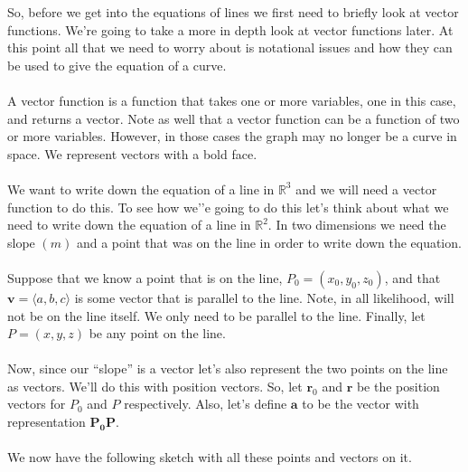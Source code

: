 \documentclass[10pt,reqno]{book}
\theoremstyle{definition}
\renewcommand{\vec}[1]{\mathbf{#1}}
\def\R{\mathbb{R}}
\begin{document}
	So, before we get into the equations of lines we first need to briefly look at vector functions.  We’re going to take a more in depth look at vector functions later.  At this point all that we need to worry about is notational issues and how they can be used to give the equation of a curve.\\ \\
	A vector function is a function that takes one or more variables, one in this case, and returns a vector.  Note as well that a vector function can be a function of two or more variables.  However, in those cases the graph may no longer be a curve in space. We represent vectors with a bold face.\\ \\
	We want to write down the equation of a line in $ \R^3 $ and we will need a vector function to do this.  To see how we’'e going to do this let's think about what we need to write down the equation of a line in $ \R^2 $.  In two dimensions we need the slope $ (m) $ and a point that was on the line in order to write down the equation.\\ \\
	Suppose that we know a point that is on the line, $ P_0 = (x_0,y_0,z_0) $, and that $ \vec{v} = \langle a,b,c \rangle $  is some vector that is parallel to the line.  Note, in all likelihood,  will not be on the line itself.  We only need  to be parallel to the line.  Finally, let $ P=(x,y,z) $ be any point on the line.\\ \\
	Now, since our ``slope'' is a vector let's also represent the two points on the line as vectors.  We'll do this with position vectors. So, let $ \vec{r}_0 $ and $ \vec{r} $  be the position vectors for $ P_0 $ and $ P $ respectively. Also, let's define $ \vec{a} $ to be the vector with representation $ \vec{P_0P} $.\\ \\
	We now have the following sketch with all these points and vectors on it.
\end{document}
